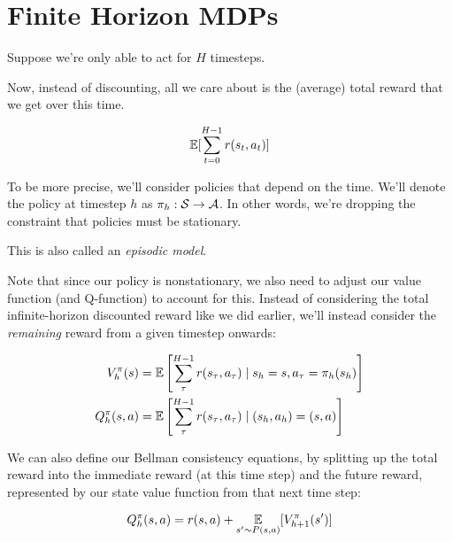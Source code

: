 \documentclass[../main/main]{subfiles}
\begin{document}
\section{Finite Horizon MDPs}

Suppose we're only able to act for $H$ timesteps.


Now, instead of discounting, all we care about is the (average) total reward
that we get over this time.

\[ \operatorname*{\mathbb{E}}[ \sum_{t=0}^{H-1} r(s_t, a_t) ] \]

To be more precise, we'll consider policies that depend on the time.
We'll denote the policy at timestep $h$ as $\pi_h : \mathcal{S} \to \mathcal{A}$. In other
words, we're dropping the constraint that policies must be stationary.

This is also called an \emph{episodic model}.



Note that since our policy is nonstationary, we also need to adjust our value
function (and Q-function) to account for this.
Instead of considering the total infinite-horizon discounted reward like we did
earlier,
we'll instead consider the \emph{remaining} reward from a given timestep
onwards:

\begin{align*}
    V^\pi_h(s) &= \operatorname*{\mathbb{E}} \left[ \sum_\tau^{H-1} r(s_\tau, a_\tau) \mid s_h = s, a_\tau = \pi_h(s_h) \right] \\
    Q^\pi_h(s, a) &= \operatorname*{\mathbb{E}} \left[ \sum_\tau^{H-1} r(s_\tau, a_\tau) \mid (s_h, a_h) = (s, a) \right]
\end{align*}


We can also define our Bellman consistency equations, by splitting up the total
reward into the immediate reward (at this time step) and the future reward,
represented by our state value function from that next time step:

\[
    Q^\pi_h(s, a) = r(s, a) + \operatorname*{\mathbb{E}}_{s' \sim P(s, a)}[V^\pi_{h+1}(s')]
\]
\end{document}
